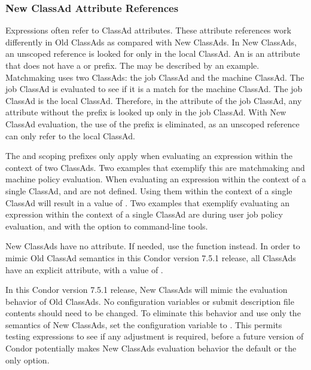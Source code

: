 \subsubsection{New ClassAd Attribute References}

Expressions often refer to ClassAd attributes.
These attribute references work differently in Old ClassAds as compared
with New ClassAds.
In New ClassAds, 
an unscoped reference is looked for only in the local ClassAd. 
An  is an attribute that does not have a
 or  prefix.
The  may be described by an example.
Matchmaking uses two ClassAds: the job ClassAd and the machine ClassAd. 
The job ClassAd is evaluated to see if it is a match for the machine ClassAd.
The job ClassAd is the local ClassAd.
Therefore, in the  attribute of the job ClassAd,
any attribute without the prefix  is looked up only
in the job ClassAd.
With New ClassAd evaluation, the use of the prefix  is eliminated,
as an unscoped reference can only refer to the local ClassAd.

The  and  scoping prefixes
only apply when evaluating an expression within the context of two ClassAds.
Two examples that exemplify this are matchmaking and machine policy evaluation.
When evaluating an expression within the context of a single ClassAd,
 and  are not defined.
Using them within the context of a single ClassAd will result
in a value of .
Two examples that exemplify evaluating an expression 
within the context of a single ClassAd are 
during user job policy evaluation,
and with the  option to command-line tools.

New ClassAds have no  attribute.
If needed, use the  function instead.
In order to mimic Old ClassAd semantics in this Condor version 7.5.1 release,
all ClassAds have an explicit  attribute,
with a value of .

In this Condor version 7.5.1 release, 
New ClassAds will mimic the evaluation behavior of Old ClassAds.
No configuration variables or submit description file contents should
need to be changed.
To eliminate this behavior and use only the semantics of New ClassAds, 
set the configuration variable
 to .
This permits testing expressions to see if any adjustment is required,
before a future version of Condor potentially makes New ClassAds
evaluation behavior the default or the only option. 

